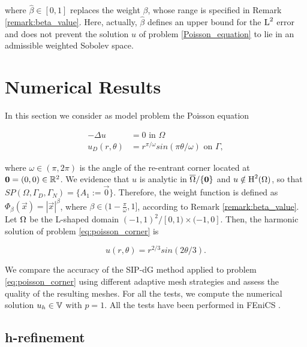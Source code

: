\documentclass[a4paper,11pt]{article}
\begin{document}
{where $\hat{\beta} \in [0,1]$ replaces the weight $\beta$, whose range is specified in Remark \ref{remark:beta_value}. Here, actually, $\hat{\beta}$ defines an upper bound for the $\operatorname L^{2}$ error and does not prevent the solution $u$ of problem \ref{Poisson_equation} to lie in an admissible weighted Sobolev space.


\section{Numerical Results}
\label{sec:Numerical_results}
In this section we consider as model problem the Poisson equation

\begin{equation}
    \begin{split}
        - \Delta u &= 0 \text{ in } \Omega\\
        u_{D}(r,\theta) &= r^{\pi/\omega} sin\left(\pi\theta / \omega \right) \text{ on } \Gamma,
    \end{split}
\label{eq:poisson_corner}
\end{equation}

where $\omega \in (\pi,2\pi)$ is the angle of the re-entrant corner located at $\boldsymbol 0 = (0,0) \in \mathbb R^{2}$. 
We evidence that $u$ is analytic in $\overline{\Omega}\slash\{\boldsymbol 0\}$ and $u \notin \operatorname H^{2}(\Omega)$, so that $\textit{SP}(\Omega,\Gamma_{D},\Gamma_{N}) = \{A_{1} := \vec{0}\}$. Therefore, the weight function is defined as $\Phi_{\beta}(\vec{x}) = |\vec{x}|^{\beta}$, where $\beta \in (1 - \frac{\pi}{\omega},1]$, according to Remark \ref{remark:beta_value}. Let $\Omega$ be the L-shaped domain $ (-1,1)^{2} \slash [0,1) \times (-1,0]$. Then, the harmonic solution of problem \eqref{eq:poisson_corner} is 

\begin{equation}
    u(r,\theta) = r^{2/3} sin(2\theta/3).
\label{eq:exact_solution_laplace}
\end{equation}

We compare the accuracy of the SIP-dG method applied to problem \eqref{eq:poisson_corner} using different adaptive mesh strategies and assess the quality of the resulting meshes. For all the tests, we compute the numerical solution $u_{h} \in \mathbb V$ with $p=1$. All the tests have been performed in FEniCS \cite{Logg:2010}.

\subsection{h-refinement}

}
\end{document}
